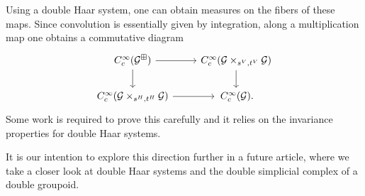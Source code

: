 \documentclass[10pt,a4paper]{amsart}
\numberwithin{equation}{section}
\theoremstyle{definition}
\newcommand{\CG}{\mathcal{G}}
\begin{document}
Using a double Haar system, one can obtain measures on the fibers of these maps. Since convolution is essentially given by integration, along a multiplication map one obtains a commutative diagram
\[
\begin{tikzcd}
  C^\infty_c(\CG^\boxplus) \arrow[d] \arrow[r] & C_c^\infty(\CG \times_{s^V, t^V} \CG ) \arrow[d] \\
  C^\infty_c(\CG \times_{s^H, t^H} \CG) \arrow[r] &\, C^\infty_c(\CG).
\end{tikzcd}
\]
Some work is required to prove this carefully and it relies on the invariance properties for double Haar systems.

It is our intention to explore this direction further in a future article, where we take a closer look at double Haar systems and the double simplicial complex of a double groupoid.
\end{document}
